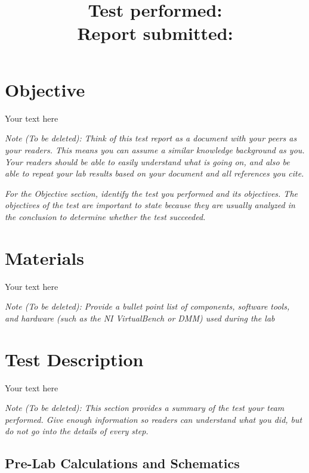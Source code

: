\documentclass[10pt]{article}
\title{
	\textbf{\courseTitle} \\
	\textbf{\documentTitle} \\
	\bigskip
	\textbf{\large{Test performed: \testDate}} \\
	\textbf{\large{Report submitted: \reportDate}} \\
	\bigskip
	\bigskip
}
\author{\documentAuthor}
\date{}
\begin{document}
	
	\maketitle
	
	\newpage
	
	\section{Objective}
	
	Your text here
	
	\medskip
	
	\textit{Note (To be deleted): Think of this test report as a document with your peers as your readers. This means you can assume a similar knowledge background as you. Your readers should be able to easily understand what is going on, and also be able to repeat your lab results based on your document and all references you cite.}
	
	\textit{For the Objective section, identify the test you performed and its objectives. The objectives of the test are important to state because they are usually analyzed in the conclusion to determine whether the test succeeded.}
	
	\section{Materials}
	
	Your text here
	
	\medskip
	
	\textit{Note (To be deleted): Provide a bullet point list of components, software tools, and hardware (such as the NI VirtualBench or DMM) used during the lab}
	
	\section{Test Description}
	
	Your text here
	
	\medskip
	
	\textit{Note (To be deleted): This section provides a summary of the test your team performed. Give enough information so readers can understand what you did, but do not go into the details of every step.}
	
	\subsection{Pre-Lab Calculations and Schematics}
	
\end{document}
